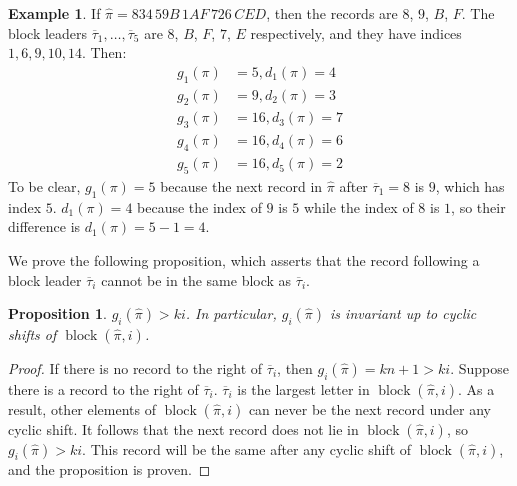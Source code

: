\documentclass{article}
\numberwithin{theorem}{section}
\newtheorem{proposition}[theorem]{Proposition}
\theoremstyle{definition}
\newtheorem{example}{Example}
\newcommand{\block}{\operatorname{block}}
\begin{document}
\begin{example}
    If $\hat\pi= 834\, 5 9 B\,1A F\,726\,CED$, then the records are $8$, $9$, $B$, $F$. The block leaders $\overline{\tau}_1,\dots,\overline{\tau}_5$ are $8$, $B$, $F$, $7$, $E$ respectively, and they have indices $1,6,9,10,14$. Then:
    \begin{align*}
        g_1(\pi) &= 5, d_1(\pi) = 4\\
        g_2(\pi) &= 9, d_2(\pi) = 3\\
        g_3(\pi) &= 16, d_3(\pi) = 7\\
        g_4(\pi) &= 16, d_4(\pi) = 6\\
        g_5(\pi) &= 16, d_5(\pi) = 2
    \end{align*}
    To be clear, $g_1(\pi) = 5$ because the next record in $\hat\pi$ after $\overline{\tau}_1 = 8$ is $9$, which has index $5$. $d_1(\pi) = 4$ because the index of $9$ is $5$ while the index of $8$ is $1$, so their difference is $d_1(\pi) = 5-1 = 4$.
\end{example}

We prove the following proposition, which asserts that the record following a block leader $\overline{\tau}_i$ cannot be in the same block as $\overline{\tau}_i$.

\begin{proposition}\label{prop:gi invariant}
    $g_i(\hat\pi) > ki$. In particular, $g_i(\hat\pi)$ is invariant up to cyclic shifts of $\block(\hat\pi, i)$.
\end{proposition}

\begin{proof}
    If there is no record to the right of $\overline{\tau}_i$, then $g_i(\hat\pi) = kn+1>ki$. Suppose there is a record to the right of $\overline{\tau}_i$. $\overline{\tau}_i$ is the largest letter in $\block(\hat\pi, i)$. As a result, other elements of $\block(\hat\pi, i)$ can never be the next record under any cyclic shift. It follows that the next record does not lie in $\block(\hat\pi, i)$, so $g_i(\hat\pi)>ki$. This record will be the same after any cyclic shift of $\block(\hat\pi, i)$, and the proposition is proven.
\end{proof}
\end{document}
